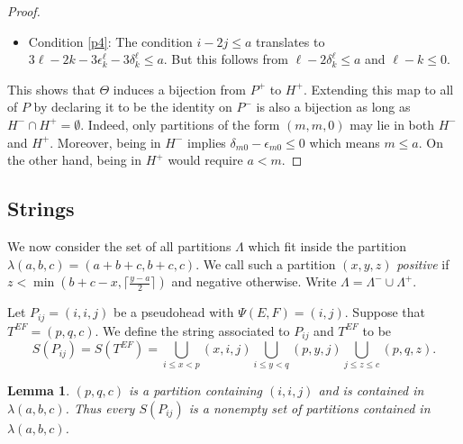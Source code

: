 \documentclass[11pt,reqno]{amsart}
\newcommand{\defn}[1]{{\color{darkred}\emph{#1}}} %
\newtheorem{lemma}[theorem]{Lemma}
\theoremstyle{definition}
\numberwithin{equation}{section}
\begin{document}
\begin{proof}
\begin{itemize}
 $3\ell-2k-2\delta_k^\ell \leqslant a$. Since $\ell-k \leqslant 0$ it suffices to show that $\ell- 2\delta_k^\ell \leqslant a$. 
 But this is clear since $\ell- 2\delta_k^\ell \leqslant \ell-2\frac{\ell-a}{2} = a$. 
\item Condition \eqref{p4}: The condition $i-2j \leqslant a$ translates to $3\ell-2k-3\epsilon_k^\ell-3\delta_k^\ell \leqslant a$.
But this follows from $\ell-2\delta_k^\ell \leqslant a$ and $\ell-k \leqslant 0$.
\end{itemize}
This shows that $\Theta$ induces a bijection from $P^+$ to $H^+$. Extending this map to all of $P$ by declaring it to be 
the identity on $P^-$ is also a bijection as long as $H^- \cap H^+ = \emptyset$.  Indeed, only 
partitions of the form $(m,m,0)$ may lie in both $H^-$ and $H^+$.  Moreover, being in $H^-$ implies 
$\delta_{m0}-\epsilon_{m0} \leqslant 0$ which means $m \leqslant a$.  On the other hand, being in $H^+$ would 
require $a<m$.
\end{proof}

\subsection{Strings}
\label{section.strings}
We now consider the set of all partitions $\Lambda$ which fit inside the partition $\lambda(a,b,c)=(a+b+c,b+c,c)$.  We call such 
a partition $(x,y,z)$ \defn{positive} if $z<\min(b+c-x,\lceil \frac{y-a}{2}\rceil)$ and negative otherwise.
Write $\Lambda=\Lambda^- \cup \Lambda^+$.  

Let $P_{ij}=(i,i,j)$ be a pseudohead with $\Psi(E,F)=(i,j)$. Suppose that $T^{EF}=(p,q,c)$.  We define the string 
associated to $P_{ij}$ and $T^{EF}$ to be
\begin{equation}
\label{equation.SP union}
	S(P_{ij})=S(T^{EF})=\bigcup_{i\leqslant x < p} (x,i,j)  \bigcup_{i \leqslant y < q} (p,y,j) 
	\bigcup_{j \leqslant z \leqslant c} (p,q,z).
\end{equation}

\begin{lemma}
$(p,q,c)$ is a partition containing $(i,i,j)$ and is contained in $\lambda(a,b,c)$.  Thus every $S(P_{ij})$ is a 
nonempty set of partitions contained in $\lambda(a,b,c)$.  
\end{lemma}
\end{document}

